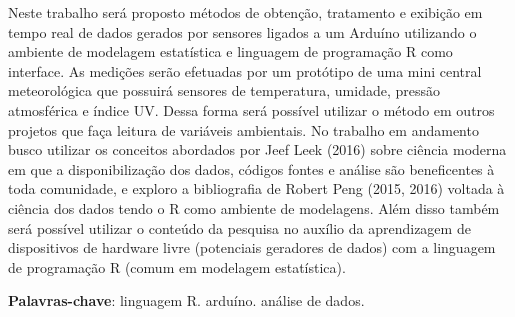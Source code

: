 \begin{resumoumacoluna}
 Neste trabalho será proposto métodos de obtenção, tratamento e exibição em tempo real de dados gerados por sensores ligados a um Arduíno utilizando o ambiente de modelagem estatística e linguagem de programação R como interface. As medições serão efetuadas por um protótipo de uma mini central meteorológica que possuirá sensores de temperatura, umidade, pressão atmosférica e índice UV. Dessa forma será possível utilizar o método em outros projetos que faça leitura de variáveis ambientais. No trabalho em andamento busco utilizar os conceitos abordados por Jeef Leek (2016) sobre ciência moderna em que a disponibilização dos dados, códigos fontes e análise são beneficentes à toda comunidade, e exploro a bibliografia de Robert Peng (2015, 2016) voltada à ciência dos dados tendo o R como ambiente de modelagens. Além disso também será possível utilizar o conteúdo da pesquisa no auxílio da aprendizagem de dispositivos de hardware livre (potenciais geradores de dados) com a linguagem de programação R (comum em modelagem estatística).
 
 \vspace{\onelineskip}
 
 \noindent
 \textbf{Palavras-chave}: linguagem R. arduíno. análise de dados.
\end{resumoumacoluna}
